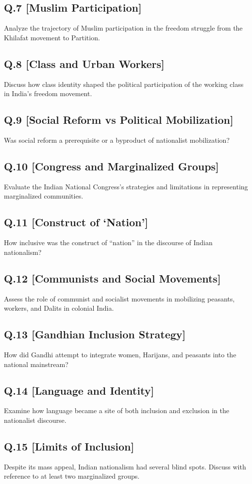 \subsection*{Q.7 [Muslim Participation]}
Analyze the trajectory of Muslim participation in the freedom struggle from the Khilafat movement to Partition.

\subsection*{Q.8 [Class and Urban Workers]}
Discuss how class identity shaped the political participation of the working class in India’s freedom movement.

\subsection*{Q.9 [Social Reform vs Political Mobilization]}
Was social reform a prerequisite or a byproduct of nationalist mobilization?

\subsection*{Q.10 [Congress and Marginalized Groups]}
Evaluate the Indian National Congress’s strategies and limitations in representing marginalized communities.

\subsection*{Q.11 [Construct of ‘Nation’]}
How inclusive was the construct of “nation” in the discourse of Indian nationalism?

\subsection*{Q.12 [Communists and Social Movements]}
Assess the role of communist and socialist movements in mobilizing peasants, workers, and Dalits in colonial India.

\subsection*{Q.13 [Gandhian Inclusion Strategy]}
How did Gandhi attempt to integrate women, Harijans, and peasants into the national mainstream?

\subsection*{Q.14 [Language and Identity]}
Examine how language became a site of both inclusion and exclusion in the nationalist discourse.

\subsection*{Q.15 [Limits of Inclusion]}
Despite its mass appeal, Indian nationalism had several blind spots. Discuss with reference to at least two marginalized groups.
